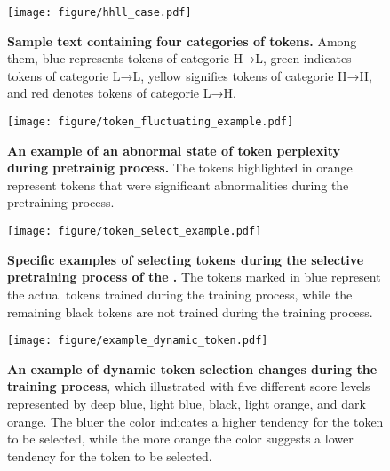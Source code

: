 
\begin{figure}[t]
\centering
\texttt{[image: figure/hhll\_case.pdf]}
\caption{\textbf{Sample text containing four categories of tokens.} Among them, \textcolor[RGB]{30,144,255}{blue} represents tokens of categorie H→L, \textcolor[RGB]{34,139,34}{green} indicates tokens of categorie L→L, \textcolor[RGB]{250,170,0}{yellow} signifies tokens of categorie H→H, and \textcolor[RGB]{250,128,114}{red} denotes tokens of categorie L→H.}
\label{fig:hhll_case}
\end{figure}

\begin{figure}[t]
\centering
\texttt{[image: figure/token\_fluctuating\_example.pdf]}
\caption{\textbf{An example of an abnormal state of token perplexity during pretrainig process.} The tokens highlighted in \textcolor[RGB]{255,140,0}{orange} represent tokens that were significant abnormalities during the pretraining process.}
\label{fig:token_fluctuating_example}
\end{figure}

\begin{figure}[t]
\centering
\texttt{[image: figure/token\_select\_example.pdf]}
\caption{\textbf{Specific examples of selecting tokens during the selective pretraining process of the \model{}.} The tokens marked in \textcolor[RGB]{30,144,255}{blue} represent the actual tokens trained during the training process, while the remaining black tokens are not trained during the training process.}
\label{fig:token_select_example}
\end{figure}

\begin{figure}[t]
\centering
\texttt{[image: figure/example\_dynamic\_token.pdf]}
\caption{\textbf{An example of dynamic token selection changes during the training process}, which illustrated with five different score levels represented by \textcolor[RGB]{0,0,255}{deep blue}, \textcolor[RGB]{30,144,255}{light blue}, black, \textcolor[RGB]{255,180,150}{light orange}, and \textcolor[RGB]{255,100,0}{dark orange}. The bluer the color indicates a higher tendency for the token to be selected, while the more orange the color suggests a lower tendency for the token to be selected.}
\label{fig:example_dynamic_token}
\end{figure}